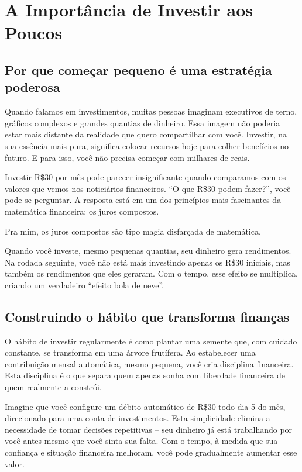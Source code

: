 \chapter{A Importância de Investir aos Poucos}

\section{Por que começar pequeno é uma estratégia poderosa}

\noindent Quando falamos em investimentos, muitas pessoas imaginam executivos de terno, gráficos complexos e grandes quantias de dinheiro. Essa imagem não poderia estar mais distante da realidade que quero compartilhar com você. Investir, na sua essência mais pura, significa colocar recursos hoje para colher benefícios no futuro. E para isso, você não precisa começar com milhares de reais.

\vspace{0.5cm}
\noindent Investir R\$30 por mês pode parecer insignificante quando comparamos com os valores que vemos nos noticiários financeiros. ``O que R\$30 podem fazer?'', você pode se perguntar. A resposta está em um dos princípios mais fascinantes da matemática financeira: os juros compostos.

\vspace{0.5cm}
\noindent Pra mim, os juros compostos são tipo magia disfarçada de matemática.

\vspace{0.5cm}
\noindent Quando você investe, mesmo pequenas quantias, seu dinheiro gera rendimentos. Na rodada seguinte, você não está mais investindo apenas os R\$30 iniciais, mas também os rendimentos que eles geraram. Com o tempo, esse efeito se multiplica, criando um verdadeiro ``efeito bola de neve''.

\section{Construindo o hábito que transforma finanças}

\noindent O hábito de investir regularmente é como plantar uma semente que, com cuidado constante, se transforma em uma árvore frutífera. Ao estabelecer uma contribuição mensal automática, mesmo pequena, você cria disciplina financeira. Esta disciplina é o que separa quem apenas sonha com liberdade financeira de quem realmente a constrói.

\vspace{0.5cm}
\noindent Imagine que você configure um débito automático de R\$30 todo dia 5 do mês, direcionado para uma conta de investimentos. Esta simplicidade elimina a necessidade de tomar decisões repetitivas – seu dinheiro já está trabalhando por você antes mesmo que você sinta sua falta. Com o tempo, à medida que sua confiança e situação financeira melhoram, você pode gradualmente aumentar esse valor.


